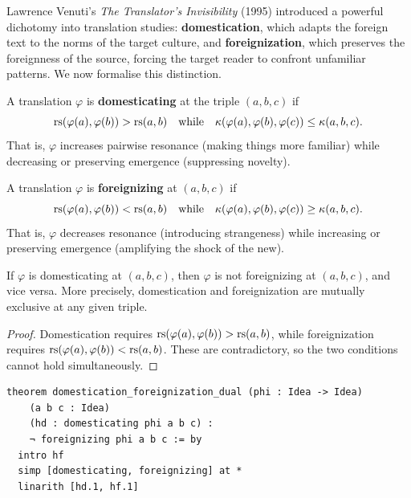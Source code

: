 Lawrence Venuti's \emph{The Translator's Invisibility} (1995) introduced a
powerful dichotomy into translation studies: \textbf{domestication}, which
adapts the foreign text to the norms of the target culture, and
\textbf{foreignization}, which preserves the foreignness of the source,
forcing the target reader to confront unfamiliar patterns.  We now formalise
this distinction.

\begin{definition}
\label{def:domesticating}
A translation $\varphi$ is \textbf{domesticating} at the triple
$(a, b, c)$ if
\[
  \mathrm{rs}(\varphi(a), \varphi(b)) > \mathrm{rs}(a, b)
  \quad \text{while} \quad
  \kappa(\varphi(a), \varphi(b), \varphi(c)) \leq \kappa(a, b, c).
\]
That is, $\varphi$ increases pairwise resonance (making things more
familiar) while decreasing or preserving emergence (suppressing novelty).
\end{definition}

\begin{definition}
\label{def:foreignizing}
A translation $\varphi$ is \textbf{foreignizing} at $(a, b, c)$ if
\[
  \mathrm{rs}(\varphi(a), \varphi(b)) < \mathrm{rs}(a, b)
  \quad \text{while} \quad
  \kappa(\varphi(a), \varphi(b), \varphi(c)) \geq \kappa(a, b, c).
\]
That is, $\varphi$ decreases resonance (introducing strangeness) while
increasing or preserving emergence (amplifying the shock of the new).
\end{definition}

\begin{theorem}
\label{thm:dom-for-dual}
If $\varphi$ is domesticating at $(a, b, c)$, then $\varphi$ is not
foreignizing at $(a, b, c)$, and vice versa.  More precisely,
domestication and foreignization are mutually exclusive at any given triple.
\end{theorem}

\begin{proof}
Domestication requires $\mathrm{rs}(\varphi(a), \varphi(b)) > \mathrm{rs}(a, b)$, while
foreignization requires $\mathrm{rs}(\varphi(a), \varphi(b)) < \mathrm{rs}(a, b)$.  These
are contradictory, so the two conditions cannot hold simultaneously.
\end{proof}

\begin{lstlisting}
theorem domestication_foreignization_dual (phi : Idea -> Idea)
    (a b c : Idea)
    (hd : domesticating phi a b c) :
    ¬ foreignizing phi a b c := by
  intro hf
  simp [domesticating, foreignizing] at *
  linarith [hd.1, hf.1]
\end{lstlisting}

